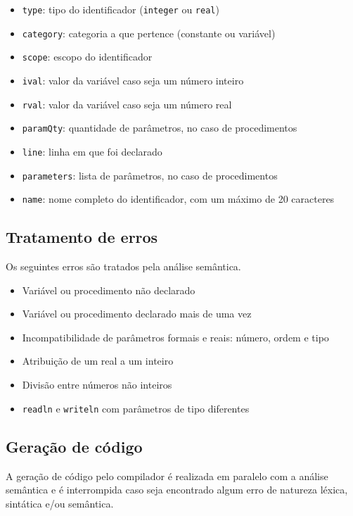 \documentclass{article}
\begin{document}
		\begin{itemize}
			\item \verb=type=: tipo do identificador (\verb=integer= ou \verb=real=)
			\item \verb=category=: categoria a que pertence (constante ou variável)
			\item \verb=scope=: escopo do identificador
			\item \verb=ival=: valor da variável caso seja um número inteiro
			\item \verb=rval=: valor da variável caso seja um número real
			\item \verb=paramQty=: quantidade de parâmetros, no caso de procedimentos
			\item \verb=line=: linha em que foi declarado
			\item \verb=parameters=: lista de parâmetros, no caso de procedimentos
			\item \verb=name=: nome completo do identificador, com um máximo de 20 caracteres
		\end{itemize}

	\subsection{Tratamento de erros} %
	\label{ssub:tratamento_de_erros}
		Os seguintes erros são tratados pela análise semântica.

		\begin{itemize}
			\item Variável ou procedimento não declarado
			\item Variável ou procedimento declarado mais de uma vez
			\item Incompatibilidade de parâmetros formais e reais: número, ordem e tipo
			\item Atribuição de um real a um inteiro
			\item Divisão entre números não inteiros
			\item \verb=readln= e \verb=writeln= com parâmetros de tipo diferentes
		\end{itemize}
	

	\subsection{Geração de código} %
	\label{sub:geracao_de_codigo}
		A geração de código pelo compilador é realizada em paralelo com a análise semântica e é interrompida caso seja encontrado algum erro de natureza léxica, sintática e/ou semântica.
\end{document}
